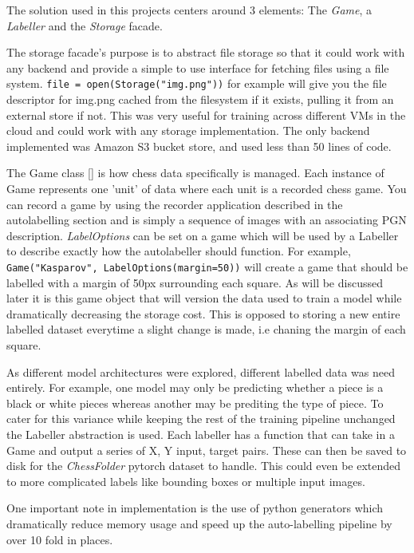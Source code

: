 The solution used in this projects centers around 3 elements: The \textit{Game}, a \textit{Labeller} and the \textit{Storage} facade.  

The storage 
facade's purpose is to abstract file storage so that it could work with any backend and provide a simple to use interface for fetching files using a file system.
\verb|file = open(Storage("img.png"))| 
for example will give you the file descriptor for img.png cached from the filesystem if it exists, pulling it from an external store if not.  
This was very useful for training across different VMs in the cloud and could work with any storage implementation.
The only backend implemented was Amazon S3 bucket store, and used less than 50 lines of code.

The Game class \ref{} is how chess data specifically is managed.  Each instance of Game represents one 'unit' of data where each unit is a recorded chess game.
You can record a game by using the recorder application described in the autolabelling section and is simply a sequence of images with
an associating PGN description. \textit{LabelOptions} can be set on a game which will be used by a Labeller to describe exactly how the autolabeller 
should function.  For example, \verb|Game("Kasparov", LabelOptions(margin=50))| will create a game that should be labelled
with a margin of 50px surrounding each square.  As will be discussed later it is this game object that will version the data used to train a model while dramatically
decreasing the storage cost.  This is opposed to storing a new entire labelled dataset everytime a slight change is made, i.e chaning the margin of each square.

As different model architectures were explored, different labelled data was need entirely.  For example, one model may only be 
predicting whether a piece is a black or white pieces whereas another may be prediting the type of piece.  To cater for this variance while keeping the rest of the 
training pipeline unchanged the Labeller abstraction is used.  Each labeller has a function that can take in a Game and output a series of X, Y input, target pairs.
These can then be saved to disk for the \textit{ChessFolder} pytorch dataset to handle. 
This could even be extended to more complicated labels like bounding boxes or multiple input images.

One important note in implementation is the use of python generators which dramatically reduce memory usage and speed up the auto-labelling pipeline by over 10 fold in 
places.


